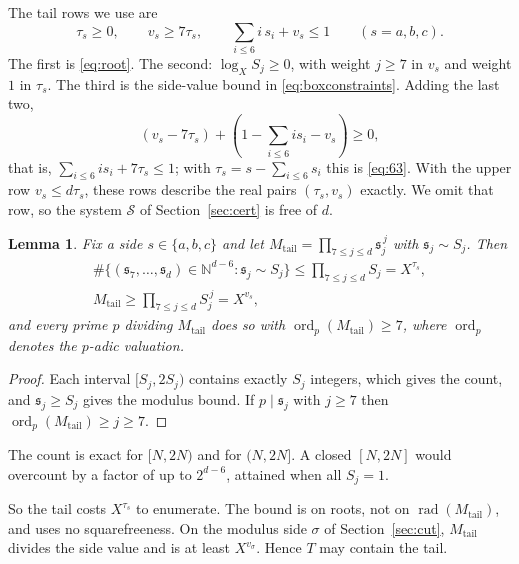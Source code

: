 \documentclass{amsart}
\newtheorem{lemma}{Lemma}[section]
\numberwithin{equation}{section}
\numberwithin{table}{section}
\newcommand{\rad}{\operatorname{rad}}
\newcommand{\N}{\mathbb{N}}
\begin{document}
The tail rows we use are
\begin{equation}\label{eq:tailrows}
 \tau_s\ge0,\qquad v_s\ge7\tau_s,\qquad \sum_{i\le6}i\,s_i+v_s\le1
 \qquad(s=a,b,c).
\end{equation}
The first is \eqref{eq:root}. The second: $\log_XS_j\ge0$, with weight
$j\ge7$ in $v_s$ and weight $1$ in $\tau_s$. The third is the side-value
bound in \eqref{eq:boxconstraints}. Adding the last two,
\[
 (v_s-7\tau_s)+(1-\sum_{i\le6}i s_i-v_s)\ge0,
\]
that is, $\sum_{i\le6}i s_i+7\tau_s\le1$; with $\tau_s=s-\sum_{i\le6}s_i$
this is \eqref{eq:63}. With the
upper row $v_s\le d\tau_s$, these rows describe the real pairs
$(\tau_s,v_s)$ exactly. We omit that row, so the system $\mathcal S$ of
Section~\ref{sec:cert} is free of $d$.

\begin{lemma}\label{lem:tail}
Fix a side $s\in\{a,b,c\}$ and let
$M_{\mathrm{tail}}=\prod_{7\le j\le d}\mathfrak s_j^{\,j}$ with
$\mathfrak s_j\sim S_j$. Then
\begin{equation}\label{eq:tailcount}
 \begin{gathered}
  \#\{(\mathfrak s_7,\dots,\mathfrak s_d)\in\N^{d-6}:\mathfrak s_j\sim S_j\}\le\prod_{7\le j\le d}S_j=X^{\tau_s},\\
  M_{\mathrm{tail}}\ge\prod_{7\le j\le d}S_j^{\,j}=X^{v_s},
 \end{gathered}
\end{equation}
and every prime $p$ dividing $M_{\mathrm{tail}}$ does so with
$\operatorname{ord}_p(M_{\mathrm{tail}})\ge7$, where $\operatorname{ord}_p$
denotes the $p$-adic valuation.
\end{lemma}

\begin{proof}
Each interval $[S_j,2S_j)$ contains exactly $S_j$ integers, which gives the
count, and $\mathfrak s_j\ge S_j$ gives the modulus bound. If $p\mid\mathfrak s_j$
with $j\ge7$ then $\operatorname{ord}_p(M_{\mathrm{tail}})\ge j\ge7$.
\end{proof}

The count is exact for $[N,2N)$ and for $(N,2N]$. A closed $[N,2N]$ would
overcount by a factor of up to $2^{d-6}$, attained when all $S_j=1$.

So the tail costs $X^{\tau_s}$ to enumerate. The bound is on roots, not on
$\rad(M_{\mathrm{tail}})$, and uses no squarefreeness. On the modulus side
$\sigma$ of Section~\ref{sec:cut}, $M_{\mathrm{tail}}$ divides the side value
and is at least $X^{v_\sigma}$. Hence $T$ may contain the tail.
\end{document}
